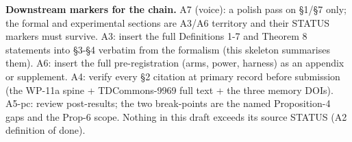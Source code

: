 \documentclass[
  11pt,
]{article}
\begin{document}
\textbf{Downstream markers for the chain.} A7 (voice): a polish pass on
§1/§7 only; the formal and experimental sections are A3/A6 territory and
their STATUS markers must survive. A3: insert the full Definitions 1-7
and Theorem 8 statements into §3-§4 verbatim from the formalism (this
skeleton summarises them). A6: insert the full pre-registration (arms,
power, harness) as an appendix or supplement. A4: verify every §2
citation at primary record before submission (the WP-11a spine +
TDCommons-9969 full text + the three memory DOIs). A5-pc: review
post-results; the two break-points are the named Proposition-4 gaps and
the Prop-6 scope. Nothing in this draft exceeds its source STATUS (A2
definition of done).
\end{document}
